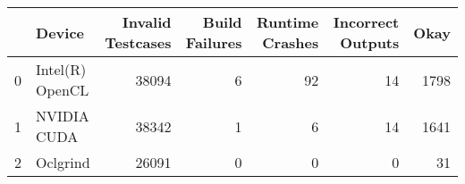 \begin{tabular}{llrrrrr}
\toprule
{} &           Device &  Invalid Testcases &  Build Failures &  Runtime Crashes &  Incorrect Outputs &  Okay \\
\midrule
0 &  Intel(R) OpenCL &              38094 &               6 &               92 &                 14 &  1798 \\
1 &      NVIDIA CUDA &              38342 &               1 &                6 &                 14 &  1641 \\
2 &         Oclgrind &              26091 &               0 &                0 &                  0 &    31 \\
\bottomrule
\end{tabular}
